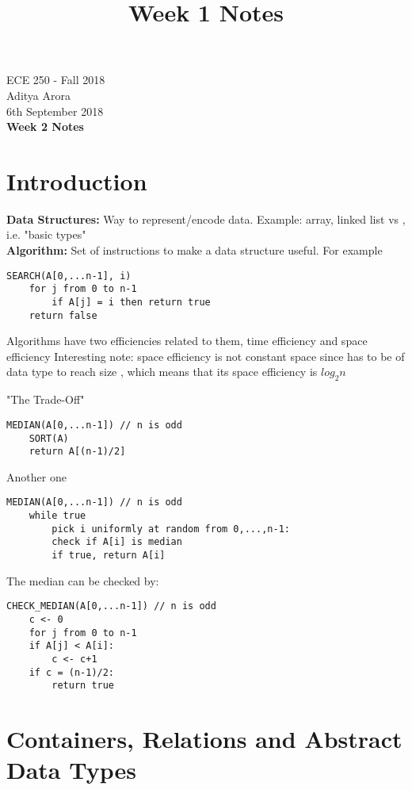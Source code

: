 \documentclass[11pt]{article}
\theoremstyle{definition}
\begin{document}
\title{Week 1 Notes}
\thispagestyle{empty}

\begin{center}
{\vspace{5mm} \LARGE ECE 250 - Fall 2018 \\ \vspace{5mm}Aditya Arora\\
\vspace{5mm} 6th September 2018}\\
{\vspace{5mm} \LARGE \bf Week 2 Notes}

\end{center}
\section{Introduction}
\textbf{Data Structures:} Way to represent/encode data. Example: array, linked list vs ,  i.e. "basic types"\\
\textbf{Algorithm:} Set of instructions to make a data structure useful. For example
\begin{lstlisting}
SEARCH(A[0,...n-1], i)
    for j from 0 to n-1
        if A[j] = i then return true
    return false
\end{lstlisting}
Algorithms have two efficiencies related to them, time efficiency and space efficiency
Interesting note: space efficiency  is not constant space since  has to be of data type to reach size , which means that its space efficiency is $log_2n$

"The Trade-Off"
\begin{lstlisting}
MEDIAN(A[0,...n-1]) // n is odd
    SORT(A)
    return A[(n-1)/2]
\end{lstlisting}
Another one
\begin{lstlisting}
MEDIAN(A[0,...n-1]) // n is odd
    while true
        pick i uniformly at random from 0,...,n-1:
        check if A[i] is median
        if true, return A[i]
\end{lstlisting}
The median can be checked by:
\begin{lstlisting}
CHECK_MEDIAN(A[0,...n-1]) // n is odd
    c <- 0
    for j from 0 to n-1
    if A[j] < A[i]:
        c <- c+1
    if c = (n-1)/2:
        return true 
\end{lstlisting}
\newpage
\section{Containers, Relations and Abstract Data Types}
\end{document}
